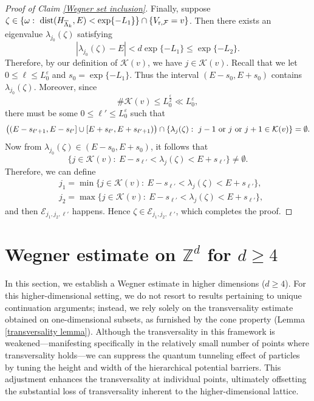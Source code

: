 \documentclass[11pt,reqno,UTF8,twoside]{amsart}
\newcommand{\Z}{\mathbb{Z}}
\newcommand{\barLambda}{\overline{\Lambda}}
\newcommand{\mcE}{\mathcal{E}}
\newcommand{\mcF}{\mathcal{F}}
\newcommand{\mcK}{\mathcal{K}}
\newcommand{\dist}{{\rm dist}}
\theoremstyle{definition}
\numberwithin{equation}{section}
\begin{document}
\begin{proof}[Proof of Claim \ref{Wegner set inclusion}]
Finally, suppose $\zeta \in \{\omega: \ \dist(H_{\barLambda_k},E)< \exp\{-L_1\}\} \cap \{V_{\text{r},\mcF}=v \} $. Then there exists an eigenvalue $\lambda_{j_0}(\zeta)$ satisfying 
\[|\lambda_{j_0}(\zeta)-E|<d \exp\{-L_1\}\leq \exp\{-L_2\}.\]
Therefore, by our definition of $\mcK(v)$, we have $j\in \mcK(v)$. Recall that we let $0\leq \ell\leq L_0^{\varepsilon}$ and $s_0=\exp\{-L_1\}$. Thus the interval $(E-s_0,E+s_0)$ contains $\lambda_{j_0}(\zeta)$. Moreover, since
\[\#\mcK(v)\leq L_0^{\frac{\varepsilon}{2}}\ll L_0^{\varepsilon},\]
there must be some $0\leq \ell' \leq L_0^{\varepsilon}$ such that 
\[\big( (E-s_{\ell'+1},E-s_{\ell'}]\cup[E+s_{\ell'},E+s_{\ell'+1}) \big)\cap \{\lambda_j(\zeta):\ j-1 \ {\rm or} \ j \ {\rm or}\ j+1\in\mcK(v)\}=\emptyset .\]
Now from  $\lambda_{j_0}(\zeta)\in (E-s_0,E+s_0)$, it follows  that  
\[\{j\in \mcK(v):\ E-s_{\ell'}<\lambda_j(\zeta)<E+s_{\ell'} \}\neq \emptyset.\]
 Therefore, we can define
\begin{align*}
   &j_1=\min\{j\in \mcK(v):\ E-s_{\ell'}<\lambda_j(\zeta)<E+s_{\ell'} \},\\
   & j_2=\max\{j\in \mcK(v):\ E-s_{\ell'}<\lambda_j(\zeta)<E+s_{\ell'} \},
\end{align*}
and then  $\mcE_{j_1,j_2,\ell'}$ happens. Hence $\zeta\in \mcE_{j_1,j_2,\ell'}$, which completes the proof.





\end{proof}












\section{Wegner estimate on $\Z^d$ for  $d\geq 4$}\label{section dim bigger 4}

In this section, we establish a Wegner estimate in higher dimensions ($d\geq4$). For this higher-dimensional setting, we do not resort to results pertaining to unique continuation arguments; instead, we rely solely on the transversality estimate obtained on one-dimensional subsets, as furnished by the cone property (Lemma \ref{transversality lemma}). Although the transversality in this framework is weakened—manifesting specifically in the relatively small number of points where transversality holds—we can suppress the quantum tunneling effect of particles by tuning the height and width of the hierarchical potential barriers. This adjustment enhances the transversality at individual points, ultimately offsetting the substantial loss of transversality inherent to the higher-dimensional lattice.
\end{document}
